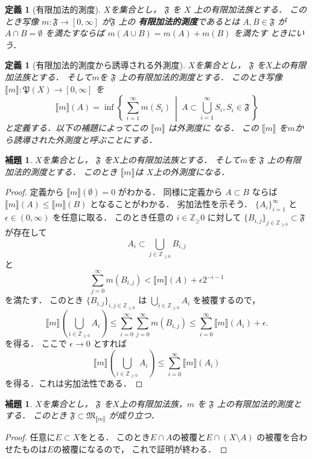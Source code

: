 \documentclass[leqno, a4paper, 12pt]{jsarticle}
\newtheorem{lem}[thm]{補題}
\newtheorem{df}[thm]{定義}
\newcommand{\zz}{\mathbb{Z}}
\newcommand{\mappa}[1]{\mathord{\llbracket #1\rrbracket}}
\begin{document}
\begin{df}[有限加法的測度]
$X$を集合とし，
$\mathfrak{F}$
を
$X$
上の有限加法族とする．
このとき写像
$m:\mathfrak{F}\to [0, \infty]$
が$\mathfrak{F}$
上の
\textbf{有限加法的測度}であるとは
$A, B\in \mathfrak{F}$
が
$A\cap B=\emptyset$
を満たすならば
$m(A\cup B)=m(A)+m(B)$
を満たす
ときにいう．
\end{df}

\begin{df}[有限加法的測度から誘導される外測度]
$X$を集合とし，
$\mathfrak{F}$
を$X$上の有限加法族とする．
そして$m$を
$\mathfrak{F}$
上の有限加法的測度とする．
このとき写像
$\mappa{m}:\mathfrak{P}(X)\to [0, \infty]$
を
\[
\mappa{m}(A) =\inf 
\left\{\, 
\sum_{i=1}^{\infty}m(S_{i})
\ 
\middle |
\ 
A\subset \bigcup_{i=1}^{\infty} S_{i}, 
S_{i}\in \mathfrak{F}
\, \right\}
\]
と定義する．以下の補題によってこの
$\mappa{m}$
は外測度に
なる．
この
$\mappa{m}$
を$m$から誘導された外測度と呼ぶことにする．
\end{df}

\begin{lem}\label{lem:fmgaisoku}
$X$を集合とし，
$\mathfrak{F}$
を$X$上の有限加法族とする．
そして$m$を
$\mathfrak{F}$
上の有限加法的測度とする．
このとき
$\mappa{m}$は
$X$上の外測度になる．
\end{lem}
\begin{proof}
定義から
$\mappa{m}(\emptyset)=0$
がわかる．
同様に定義から
$A\subset B$
ならば
$\mappa{m}(A)\le \mappa{m}(B)$
となることがわかる．
劣加法性を示そう．
$\{A_{i}\}_{i=1}^{\infty}$
と
$\epsilon\in (0, \infty)$
を任意に取る．
このとき任意の
$i\in \zz_\ge 0$
に対して
$\{B_{i, j}\}_{j\in \zz_{\ge 0}}\subset \mathfrak{F}$
が存在して
\[
A_{i}\subset \bigcup_{j\in \zz_{\ge 0}}B_{i, j}
\]
と
\[
\sum_{j=0}^{\infty}m(B_{i, j})<
\mappa{m}(A)+\epsilon 2^{-i-1}
\]
を満たす．
このとき
$\{B_{i, j}\}_{i, j\in \zz_{\ge 0}}$
は
$\bigcup_{i\in \zz_{\ge 0}}A_{i}$
を被覆するので，
\[
\mappa{m}\left(\bigcup_{i\in \zz_{\ge 0}}A_{i}\right)
\le \sum_{i=0}^{\infty}\sum_{j=0}^{\infty}m(B_{i, j})
\le \sum_{i=0}^{\infty}\mappa{m}(A_{i})+\epsilon. 
\]
を得る．
ここで
$\epsilon\to 0$
とすれば
\[
\mappa{m}\left(\bigcup_{i\in \zz_{\ge 0}}A_{i}\right)
\le \sum_{i=0}^{\infty}\mappa{m}(A_{i})
\]
を得る．これは劣加法性である．
\end{proof}



\begin{lem}\label{lem:sasa}
$X$を集合とし，
$\mathfrak{F}$
を$X$上の有限加法族，$m$
を
$\mathfrak{F}$
上の有限加法的測度とする．
このとき
$\mathfrak{F}\subset \mathfrak{M}_{\mappa{m}}$
が成り立つ．
\end{lem}
\begin{proof}
任意に$E\subset X$をとる．
このとき$E\cap A$の被覆と$E\cap (X\setminus A)$
の被覆を合わせたものは$E$の被覆になるので，
これで証明が終わる．
\end{proof}
\end{document}
